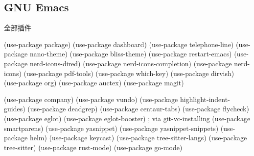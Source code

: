 \documentclass[11pt]{article}
\begin{document}
\subsection{GNU Emacs}
全部插件
\begin{code}
  (use-package package)
  (use-package dashboard)  
  (use-package telephone-line)
  (use-package nano-theme)
  (use-package bliss-theme)
  (use-package restart-emacs)      
  (use-package nerd-icons-dired)
  (use-package nerd-icons-completion)
  (use-package nerd-icons)
  (use-package pdf-tools)  
  (use-package which-key)
  (use-package dirvish)
  (use-package org)
  (use-package auctex)  
  (use-package magit)  

  (use-package company)
  (use-package vundo)
  (use-package highlight-indent-guides)
  (use-package deadgrep)
  (use-package centaur-tabs)
  (use-package flycheck)
  (use-package eglot)      
  (use-package eglot-booster)   ; via git-vc-installing
  (use-package smartparens)
  (use-package yasnippet)
  (use-package yasnippet-snippets)
  (use-package helm)
  (use-package keycast)
  (use-package tree-sitter-langs)
  (use-package tree-sitter)
  (use-package rust-mode)
  (use-package go-mode)
\end{code}
\end{document}
